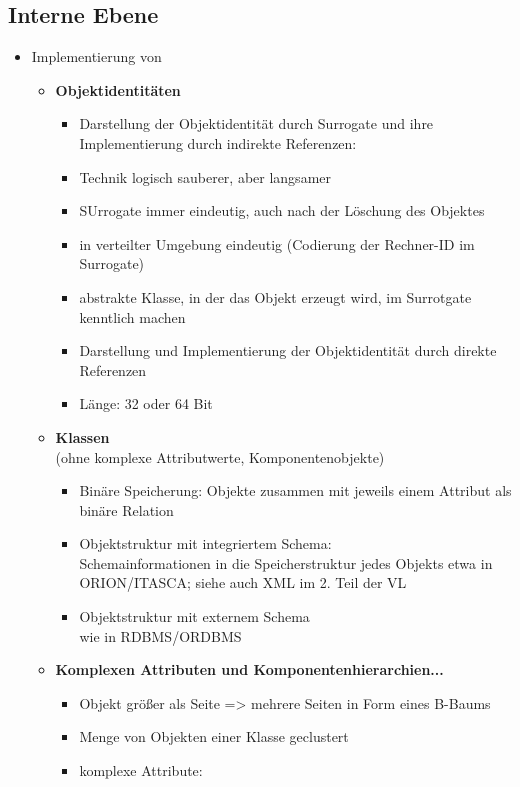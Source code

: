 \subsection{Interne Ebene}
\begin{itemize}
	\item Implementierung von 
	\begin{itemize}
		\item \textbf{Objektidentitäten}
		\begin{itemize}
			\item Darstellung der Objektidentität durch Surrogate und ihre Implementierung durch indirekte Referenzen:
			\item Technik logisch sauberer, aber langsamer
			\item SUrrogate immer eindeutig, auch nach der Löschung des Objektes
			\item in verteilter Umgebung eindeutig (Codierung der Rechner-ID im Surrogate)
			\item abstrakte Klasse, in der das Objekt erzeugt wird, im Surrotgate kenntlich machen
			\item Darstellung und Implementierung der Objektidentität durch direkte Referenzen
			\item Länge: 32 oder 64 Bit
		\end{itemize}
		\item \textbf{Klassen}\\
		{\tiny (ohne komplexe Attributwerte, Komponentenobjekte)}
		\begin{itemize}
			\item Binäre Speicherung: Objekte zusammen mit jeweils einem Attribut als binäre Relation
			\item Objektstruktur mit integriertem Schema:\\
			Schemainformationen in die Speicherstruktur jedes Objekts etwa in ORION/ITASCA; siehe auch XML im 2. Teil der VL
			\item Objektstruktur mit externem Schema\\
			wie in RDBMS/ORDBMS
		\end{itemize}
		\item \textbf{Komplexen Attributen und Komponentenhierarchien...}
		\begin{itemize}
			\item Objekt größer als Seite => mehrere Seiten in Form eines B-Baums
			\item Menge von Objekten einer Klasse geclustert
			\item komplexe Attribute:\\

\end{itemize}
\end{itemize}
\end{itemize}
